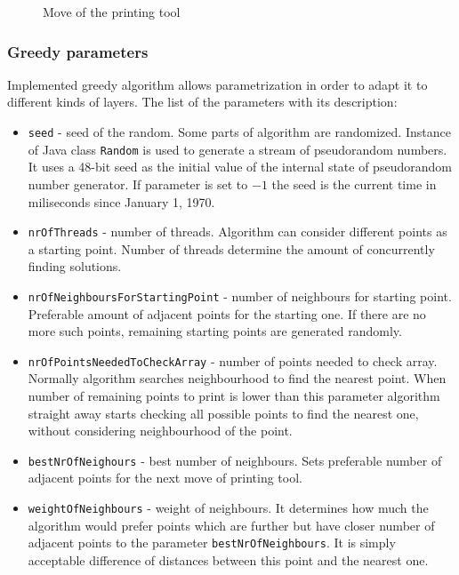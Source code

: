 \documentclass[titlepage]{article}
\newcommand{\multifigcaption}{\captionsetup{justification=justified}}
\begin{document}
\begin{figure}[H]
\begin{center}
\begin{minipage}{.45\linewidth}
 			\multifigcaption
 			\caption{Move of the printing tool \newline}
			\label{img:greedy/example-neighbours-neigh-solv} 
		\end{minipage}
	\end{center}
\end{figure}

\subsubsection{Greedy parameters}

Implemented greedy algorithm allows parametrization in order to adapt it to different kinds of layers. The list of the parameters with its description:

\begin{itemize}
	\item \texttt{seed} - seed of the random. Some parts of algorithm are randomized. Instance of Java class \texttt{Random} is used to generate a stream of pseudorandom numbers. It uses a 48-bit seed as the initial value of the internal state of pseudorandom number generator. If parameter is set to $-1$ the seed is the current time in miliseconds since January 1, 1970.
	
	\item \texttt{nrOfThreads} - number of threads. Algorithm can consider different points as a starting point. Number of threads determine the amount of concurrently finding solutions.
	
	\item \texttt{nrOfNeighboursForStartingPoint} - number of neighbours for starting point. Preferable amount of adjacent points for the starting one. If there are no more such points, remaining starting points are generated randomly.
	
	\item \texttt{nrOfPointsNeededToCheckArray} - number of points needed to check array. Normally algorithm searches neighbourhood to find the nearest point. When number of remaining points to print is lower than this parameter algorithm straight away starts checking all possible points to find the nearest one, without considering neighbourhood of the point.
	
	\item \texttt{bestNrOfNeighours} - best number of neighbours. Sets preferable number of adjacent points for the next move of printing tool.
	
	\item \texttt{weightOfNeighbours} - weight of neighbours. It determines how much the algorithm would prefer points which are further but have closer number of adjacent points to the parameter \texttt{bestNrOfNeighbours}. It is simply acceptable difference of distances between this point and the nearest one.
	

\end{itemize}
\end{document}
